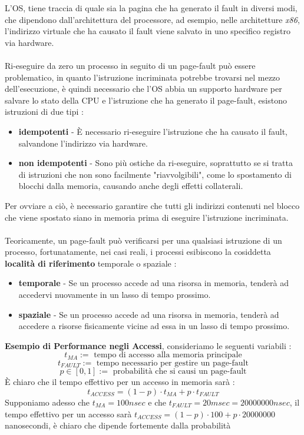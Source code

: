 \documentclass[12pt, letterpaper]{article}
\newcommand{\acc}{\\\hphantom{}\\}
\begin{document}
L'OS, tiene traccia di quale sia la pagina che ha generato il fault in diversi modi, che dipendono dall'architettura 
del processore, ad esempio, nelle architetture \textit{x86}, l'indirizzo virtuale che ha causato il fault viene 
salvato in uno specifico registro via hardware.\acc 
Ri-eseguire da zero un processo in seguito di un page-fault può essere problematico, in quanto l'istruzione incriminata 
potrebbe trovarsi nel mezzo dell'esecuzione, è quindi necessario che l'OS abbia un supporto hardware 
per salvare lo stato della CPU e l'istruzione che ha generato il page-fault, esistono istruzioni di due tipi : \begin{itemize}
    \item \textbf{idempotenti} - È necessario ri-eseguire l'istruzione che ha causato il fault, salvandone l'indirizzo 
    via hardware. 
    \item \textbf{non idempotenti} - Sono più ostiche da ri-eseguire, soprattutto se si tratta di istruzioni che non sono 
    facilmente "riavvolgibili", come lo spostamento di blocchi dalla memoria, causando anche degli effetti collaterali.
\end{itemize}
Per ovviare a ciò, è necessario garantire che tutti gli indirizzi contenuti nel blocco che viene spostato siano in 
memoria prima di eseguire l'istruzione incriminata.\acc
Teoricamente, un page-fault può verificarsi per una qualsiasi istruzione di un processo, fortunatamente, nei casi reali, 
i processi esibiscono la cosiddetta \textbf{località di riferimento} temporale o spaziale : \begin{itemize}
    \item \textbf{temporale} - Se un processo accede ad una risorsa in memoria, tenderà ad accedervi nuovamente 
    in un lasso di tempo prossimo.
    \item \textbf{spaziale} - Se un processo accede ad una risorsa in memoria, tenderà ad accedere a risorse 
    fisicamente vicine ad essa in un lasso di tempo prossimo.
\end{itemize}
\textbf{Esempio di Performance negli Accessi}, consideriamo le seguenti variabili : 
$$t_{MA} := \text{ tempo di accesso alla memoria principale}$$ 
$$t_{FAULT} := \text{ tempo necessario per gestire un page-fault}$$ 
$$p\in[0,1] := \text{ probabilità che si causi un page-fault}$$
È chiaro che il tempo effettivo per un accesso in memoria sarà : $$t_{ACCESS}=(1-p)\cdot t_{MA} + p\cdot t_{FAULT}$$
Supponiamo adesso che $t_{MA}=100 nsec$ e che $t_{FAULT}=20 msec=20000000nsec$, il tempo effettivo per un 
accesso sarà $t_{ACCESS}=(1-p)\cdot 100 + p\cdot 20000000$ nanosecondi, è chiaro che dipende fortemente dalla probabilità 
\end{document}

